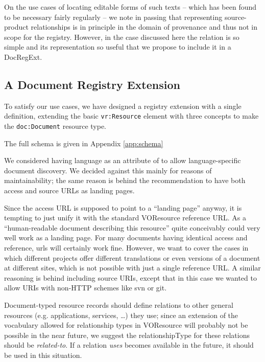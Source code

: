 \documentclass{ivoa}
\begin{document}
On the use cases of locating editable forms of such texts – which
has been found to be necessary fairly regularly – we note in passing
that representing source-product relationships is in principle in the
domain of provenance and thus not in scope for the registry. However, in
the case discussed here the relation is so simple and its representation
so useful that we propose to include it in a DocRegExt.


\subsection{A Document Registry Extension}

\label{sect:regext-ext}

To satisfy our use cases, we have designed a registry extension with
a single definition, extending the basic \texttt{vr:Resource}
element with three concepts to make the \texttt{doc:Document}
resource type.

The full schema is given in Appendix \ref{app:schema}

We considered  having language as an attribute of  to allow
language-specific document discovery.  We decided against this mainly
for reasons of maintainability; the same reason is behind the
recommendation to have both access and source URLs as landing pages.

Since the access URL is supposed to point to a ``landing page'' anyway,
it is tempting to just unify it with the standard VOResource reference
URL. As a ``human-readable document describing this resource''
\citep{2008ivoa.spec.0222P} quite conceivably could very well work as a landing
page.  For many documents having identical access and reference, urls
will certainly work fine.  However, we want to cover the cases in
which different projects offer different translations or even versions
of a document at different sites, which is not possible with just a
single reference URL.  A similar reasoning is behind including source
URIs, except that in this case we wanted to allow URIs with non-HTTP
schemes like svn or git.

Document-typed resource records should define relations to other
general resources (e.g. applications, services, \dots) 
they use; since an extension of the vocabulary allowed for relationship types
in VOResource will probably not be possible in the near future,
we suggest the relationshipType for these relations should be
\emph{related-to}.  If a relation \emph{uses} becomes available
in the future, it should be used in this situation.
\end{document}
